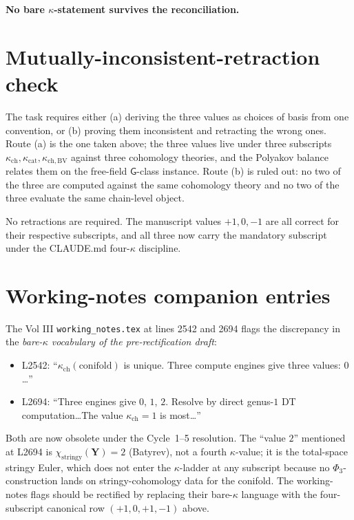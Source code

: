 \documentclass[11pt]{amsart}
\theoremstyle{definition}
\providecommand{\bY}{\mathbf{Y}}
\begin{document}
\textbf{No bare $\kappa$-statement survives the reconciliation.}

\section*{Mutually-inconsistent-retraction check}

The task requires either (a) deriving the three values as choices
of basis from one convention, or (b) proving them inconsistent and
retracting the wrong ones. Route (a) is the one taken above; the
three values live under three subscripts
$\kappa_{\mathrm{ch}}, \kappa_{\mathrm{cat}}, \kappa_{\mathrm{ch,BV}}$
against three cohomology theories, and the Polyakov balance
relates them on the free-field $\mathsf G$-class instance. Route
(b) is ruled out: no two of the three are computed against the
same cohomology theory and no two of the three evaluate the same
chain-level object.

No retractions are required. The manuscript values $+1, 0, -1$ are
all correct for their respective subscripts, and all three now
carry the mandatory subscript under the CLAUDE.md four-$\kappa$
discipline.

\section*{Working-notes companion entries}

The Vol III \texttt{working\_notes.tex} at lines 2542 and 2694
flags the discrepancy in the \emph{bare-$\kappa$ vocabulary of the
pre-rectification draft}:
\begin{itemize}[leftmargin=2em]
\item L2542: ``$\kappa_{\mathrm{ch}}(\mathrm{conifold})$ is unique.
  Three compute engines give three values: $0$\ldots''
\item L2694: ``Three engines give $0$, $1$, $2$. Resolve by direct
  genus-$1$ DT computation\ldots The value
  $\kappa_{\mathrm{ch}} = 1$ is most\ldots''
\end{itemize}
Both are now obsolete under the Cycle~1--5 resolution. The
``value $2$'' mentioned at L2694 is $\chi_{\mathrm{stringy}}(\bY)
= 2$ (Batyrev), not a fourth $\kappa$-value; it is
the total-space stringy Euler, which does not enter the
$\kappa$-ladder at any subscript because no $\Phi_3$-construction
lands on stringy-cohomology data for the conifold. The
working-notes flags should be rectified by replacing their
bare-$\kappa$ language with the four-subscript canonical row
$(+1, 0, +1, -1)$ above.
\end{document}
